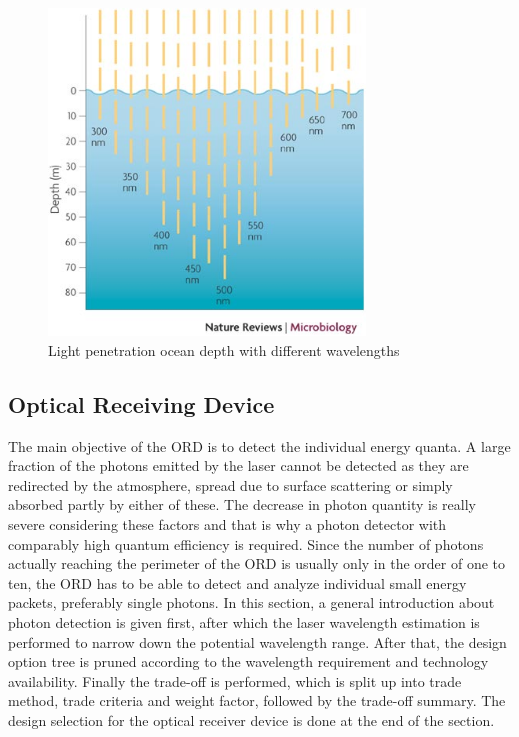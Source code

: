 \begin{figure}[ht!]
\centering
\includegraphics[width=0.75\textwidth]{chapters/img/Ocean_absorption.jpg}
\caption{Light penetration ocean depth with different wavelengths}
\label{fig:intro_ocean_penetrate}
\end{figure}

\subsection{Optical Receiving Device}
\label{TOORD}
The main objective of the \ac{ORD} is to detect the individual energy quanta. A large fraction of the photons emitted by the \acs{laser} cannot be detected as they are redirected by the atmosphere, spread due to surface scattering or simply absorbed partly by either of these. The decrease in photon quantity is really severe considering these factors and that is why a photon detector with comparably high quantum efficiency is required. Since the number of photons actually reaching the perimeter of the \ac{ORD} is usually only in the order of one to ten, the \acs{ORD} has to be able to detect and analyze individual small energy packets, preferably single photons. In this section, a general introduction about photon detection is given first, after which the \acs{laser} wavelength estimation is performed to narrow down the potential wavelength range. After that, the design option tree is pruned according to the wavelength requirement and technology availability. Finally the trade-off is performed, which is split up into trade method, trade criteria and weight factor, followed by the trade-off summary. The design selection for the optical receiver device is done at the end of the section.

